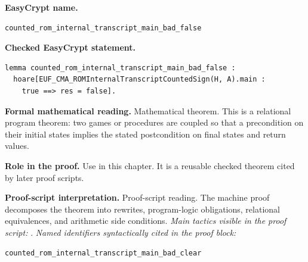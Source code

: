 \begin{formaltheorem}
\noindent\textbf{EasyCrypt name.}
\begin{lstlisting}[language=EasyCrypt,basicstyle=\ttfamily\scriptsize]
counted_rom_internal_transcript_main_bad_false
\end{lstlisting}
\noindent\textbf{Checked EasyCrypt statement.}
\begin{lstlisting}[language=EasyCrypt,basicstyle=\ttfamily\scriptsize]
lemma counted_rom_internal_transcript_main_bad_false :
  hoare[EUF_CMA_ROMInternalTranscriptCountedSign(H, A).main :
    true ==> res = false].
\end{lstlisting}
\noindent\textbf{Formal mathematical reading.}
Mathematical theorem. This is a relational program theorem: two games or procedures are coupled so that a precondition on their initial states implies the stated postcondition on final states and return values.

\noindent\textbf{Role in the proof.}
Use in this chapter. It is a reusable checked theorem cited by later proof scripts.

\noindent\textbf{Proof-script interpretation.}
Proof-script reading. The machine proof decomposes the theorem into rewrites, program-logic obligations, relational equivalences, and arithmetic side conditions.
\emph{Main tactics visible in the proof script:} .
\emph{Named identifiers syntactically cited in the proof block:}
\begin{lstlisting}[language=EasyCrypt,basicstyle=\ttfamily\scriptsize]
counted_rom_internal_transcript_main_bad_clear
\end{lstlisting}

\end{formaltheorem}

